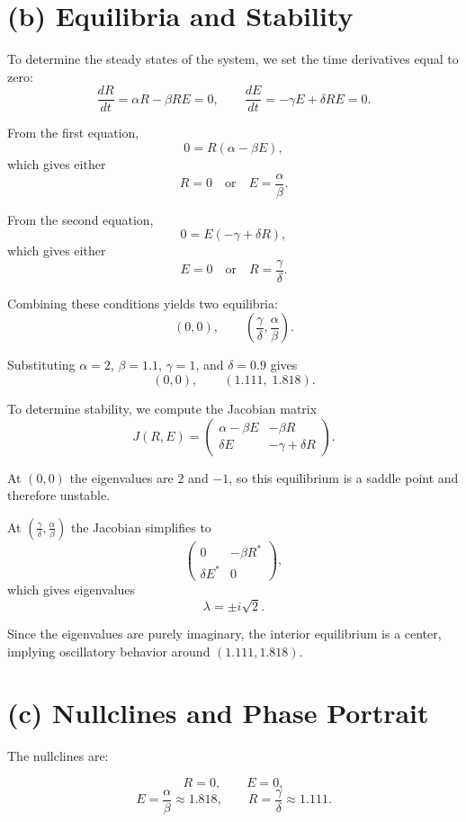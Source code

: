 \documentclass[12pt]{article}
\begin{document}
\section*{(b) Equilibria and Stability}

To determine the steady states of the system, we set the time derivatives equal to zero:
\[
\frac{dR}{dt} = \alpha R - \beta R E = 0,
\qquad
\frac{dE}{dt} = -\gamma E + \delta R E = 0.
\]

From the first equation,
\[
0 = R(\alpha - \beta E),
\]
which gives either
\[
R = 0
\quad \text{or} \quad
E = \frac{\alpha}{\beta}.
\]

From the second equation,
\[
0 = E(-\gamma + \delta R),
\]
which gives either
\[
E = 0
\quad \text{or} \quad
R = \frac{\gamma}{\delta}.
\]

Combining these conditions yields two equilibria:
\[
(0,0),
\qquad
\left(\frac{\gamma}{\delta}, \frac{\alpha}{\beta}\right).
\]

Substituting $\alpha=2$, $\beta=1.1$, $\gamma=1$, and $\delta=0.9$ gives
\[
(0,0),
\qquad
(1.111,\;1.818).
\]

To determine stability, we compute the Jacobian matrix
\[
J(R,E)=
\begin{pmatrix}
\alpha - \beta E & -\beta R \\
\delta E & -\gamma + \delta R
\end{pmatrix}.
\]

At $(0,0)$ the eigenvalues are $2$ and $-1$, so this equilibrium is a saddle point and therefore unstable.

At $\left(\frac{\gamma}{\delta}, \frac{\alpha}{\beta}\right)$ the Jacobian simplifies to
\[
\begin{pmatrix}
0 & -\beta R^* \\
\delta E^* & 0
\end{pmatrix},
\]
which gives eigenvalues
\[
\lambda = \pm i\sqrt{2}.
\]

Since the eigenvalues are purely imaginary, the interior equilibrium is a center, implying oscillatory behavior around $(1.111,1.818)$.

\section*{(c) Nullclines and Phase Portrait}

The nullclines are:

\[
R=0, \qquad E=0,
\]
\[
E=\frac{\alpha}{\beta}\approx 1.818,
\qquad
R=\frac{\gamma}{\delta}\approx 1.111.
\]
\end{document}
